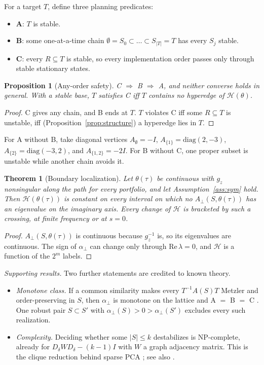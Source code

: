 \documentclass[journal]{IEEEtran}
\newtheorem{theorem}{Theorem}
\newtheorem{proposition}{Proposition}
\theoremstyle{definition}
\theoremstyle{remark}
\newcommand{\Hy}{\mathcal{H}}
\newcommand{\aperp}{\alpha_{\perp}}
\newcommand{\Aperp}{A_{\perp}}
\begin{document}
For a target $T$, define three planning predicates:
\begin{itemize}
\item \textbf{A}: $T$ is stable.
\item \textbf{B}: some one-at-a-time chain
$\emptyset=S_0\subset\dots\subset S_{|T|}=T$ has every $S_j$ stable.
\item \textbf{C}: every $R\subseteq T$ is stable, so every implementation order
passes only through stable stationary states.
\end{itemize}

\begin{proposition}[Any-order safety]\label{prop:hierarchy}
C $\Rightarrow$ B $\Rightarrow$ A, and neither converse holds in general. With a
stable base, $T$ satisfies C iff $T$ contains no hyperedge of $\Hy(\theta)$.
\end{proposition}
\begin{proof}
C gives any chain, and B ends at $T$. $T$ violates C iff some $R\subseteq T$ is
unstable, iff (Proposition~\ref{prop:structure}) a hyperedge lies in $T$.
\end{proof}
For A without B, take diagonal vertices $A_\emptyset=-I$,
$A_{\{1\}}=\mathrm{diag}(2,-3)$, $A_{\{2\}}=\mathrm{diag}(-3,2)$, and
$A_{\{1,2\}}=-2I$. For B without C, one proper subset is unstable while
another chain avoids it.

\begin{theorem}[Boundary localization]\label{thm:localization}
Let $\theta(\tau)$ be continuous with $g_z$ nonsingular along the path for every
portfolio, and let Assumption~\ref{ass:sym} hold. Then $\Hy(\theta(\tau))$ is
constant on every interval on which no $\Aperp(S,\theta(\tau))$ has an
eigenvalue on the imaginary axis. Every change of $\Hy$ is bracketed by such a
crossing, at finite frequency or at $s=0$.
\end{theorem}
\begin{proof}
$\Aperp(S,\theta(\tau))$ is continuous because $g_z^{-1}$ is, so its
eigenvalues are continuous. The sign of $\aperp$ can change only through
$\mathrm{Re}\,\lambda=0$, and $\Hy$ is a function of the $2^m$ labels.
\end{proof}

\emph{Supporting results.} Two further statements are credited to known
theory.
\begin{itemize}
\item \emph{Monotone class.} If a common similarity makes every
$T^{-1}A(S)T$ Metzler and order-preserving in $S$, then $\aperp$ is monotone
on the lattice and A $=$ B $=$ C \cite{farina2000positive}. One robust pair
$S\subset S'$ with $\aperp(S)>0>\aperp(S')$ excludes every such realization.
\item \emph{Complexity.} Deciding whether some $|S|\le k$ destabilizes is
NP-complete, already for $D_\delta WD_\delta-(k-1)I$ with $W$ a graph adjacency
matrix. This is the clique reduction behind sparse PCA
\cite{karp1972, magdon2017sparsepca}; see also
\cite{poljak1993robust, nemirovskii1993robust, katewa2020sparse}.
\end{itemize}
\label{prop:monotone}\label{prop:complexity}
\end{document}
